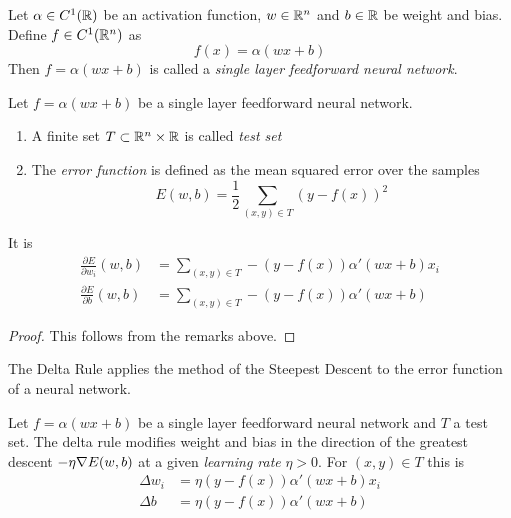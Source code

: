 \begin{definition}
    Let \( \alpha \in C^1(\mathbb{R}) \) be an activation function, \( w \in \mathbb{R}^n \)  and \( b \in \mathbb{R} \)
    be weight and bias. Define \( f \in C^1(\mathbb{R}^n) \) as
    \[
        f(x) = \alpha(w x + b)
    \]
    Then \( f = \alpha(wx + b) \) is called a \emph{single layer feedforward neural network}.
\end{definition}
\bigskip


\begin{definition}
    Let \( f = \alpha(wx + b) \) be a single layer feedforward neural network.
    \begin{enumerate}
        \item A finite set \( T \subset \mathbb{R}^n \times \mathbb{R} \) is called  \emph{test set}
        \item The \emph{error function} is defined as the mean squared error over the samples
              \[
                  E(w,b) = \frac{1}{2} \sum_{(x,y) \in T} {(y - f(x))}^2
              \]
    \end{enumerate}
\end{definition}
\bigskip


\begin{lemma}
    It is
    \[
        \begin{split}
            \frac{\partial E}{\partial w_i}(w, b) &= \sum_{(x,y) \in T} - (y - f(x)) \alpha'(wx + b) x_i\\
            \frac{\partial E}{\partial b}(w, b) &= \sum_{(x,y) \in T} - (y - f(x)) \alpha'(wx + b)
        \end{split}
    \]
\end{lemma}

\begin{proof}
    This follows from the remarks above.
\end{proof}
\bigskip


The Delta Rule applies the method of the Steepest Descent to the error function of a neural network.
\bigskip


\begin{algorithm}\label{algo:delta_rule}
    Let \( f = \alpha(wx + b) \) be a single layer feedforward neural network
    and \( T \) a test set.
    The delta rule modifies weight and bias in the direction of the greatest descent \( - \eta \nabla E(w,b) \)
    at a given \emph{learning rate} \( \eta > 0 \).  For \( (x, y) \in T \) this is
    \[
        \begin{split}
            \Delta w_i & = \eta (y - f(x)) \alpha'(wx + b) x_i \\
            \Delta b & = \eta (y - f(x)) \alpha'(wx + b)
        \end{split}
    \]
\end{algorithm}
\bigskip


